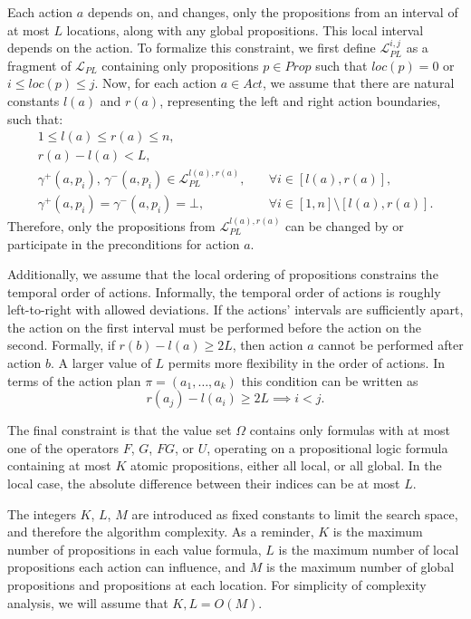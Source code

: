 \documentclass[a4paper,fleqn]{cas-dc}
\begin{document}
Each action $a$ depends on, and changes, only the propositions from an interval of at most $L$ locations,
along with any global propositions. This local interval depends on the action. 
To formalize this constraint, we first define $\mathcal{L}_{PL}^{i, j}$ as a fragment of $\mathcal{L}_{PL}$
containing only propositions $p\in Prop$ such that $loc(p)=0$ or $i\le loc(p)\le j$.
Now, for each action $a\in Act$, we assume that there are natural constants $l(a)$ and $r(a)$, representing the left and right action boundaries, such that: 
\begin{equation}
\begin{aligned}1\le l(a) \le r(a) \le n, \\ r(a)-l(a)< L,\\
\gamma^+(a, p_i),\,\gamma^-(a, p_i)\in \mathcal{L}_{PL}^{l(a), r(a)}, \quad & \forall i\in[l(a),r(a)],\\
\gamma^+(a, p_i)=\gamma^-(a, p_i)=\bot, \quad & \forall i\in [1,n]\setminus[l(a),r(a)].\end{aligned}\end{equation}
Therefore, only the propositions from $\mathcal{L}_{PL}^{l(a), r(a)}$ can be changed by or participate in the preconditions for action $a$.

Additionally, we assume that the local ordering of propositions constrains the temporal order of actions.
Informally, the temporal order of actions is roughly left-to-right with allowed deviations.
If the actions' intervals are sufficiently apart, the action on the first interval must be performed before the action on the second. Formally, if $r(b)-l(a)\ge 2L$, then action $a$ cannot be performed after action $b$.
A larger value of $L$ permits more flexibility in the order of actions.
In terms of the action plan $\pi = (a_1, \dots, a_k)$ this condition can be written as
\begin{equation}r(a_j)-l(a_i)\ge 2L \implies i<j.\label{k}\end{equation}

The final constraint is that the value set $\Omega$ contains only formulas with at most one of the operators
$F$, $G$, $FG$, or $U$, operating on a propositional logic formula containing at most $K$ atomic propositions, %
either all local, or all global. In the local case, the absolute difference between their indices can be at most $L$.

The integers $K$, $L$, $M$ are introduced as fixed constants to limit the search space,
and therefore the algorithm complexity. As a reminder,
$K$ is the maximum number of propositions in each value formula,
$L$ is the maximum number of local propositions each action can influence,
and $M$ is the maximum number of global propositions and propositions at each location.
For simplicity of complexity analysis, we will assume that $K, L= O(M)$.
\end{document}
